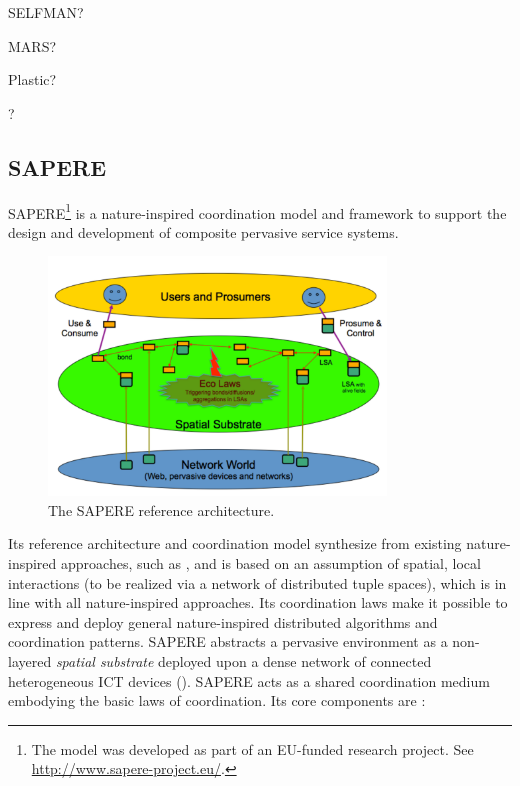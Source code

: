 \documentclass[12pt,a4paper,twoside,openright]{book}
\begin{document}
SELFMAN? \cite{selfman}

MARS? \cite{mars}

Plastic? \cite{plastic}

\cartago{}? \cite{RPV-JAAMAS2011}

\subsection{SAPERE}
SAPERE\footnote{The model was developed as part of an EU-funded research project. See \url{http://www.sapere-project.eu/}.} \cite{sapere-procedia7} is a nature-inspired coordination model and framework to support the design and development of composite pervasive service systems.
\begin{figure}
\centering
\includegraphics[width=0.8\textwidth]{img/architecture_2.pdf}
\caption[SAPERE reference architecture]{The SAPERE reference architecture.}
\label{img:sapere-architecture}
\end{figure}
%
Its reference architecture and coordination model synthesize from existing nature-inspired approaches, such as \cite{biochemicalTupleSpaces, frameworkSelfOrg, VCMZ-TAAS2011, wordNet}, and is based on an assumption of spatial, local interactions (to be realized via a network of distributed tuple spaces), which is in line with all nature-inspired approaches.
%
Its coordination laws make it possible to express and deploy general nature-inspired distributed algorithms and coordination patterns.
%
SAPERE abstracts a pervasive environment as a non-layered \emph{spatial substrate} deployed upon a dense network of connected heterogeneous ICT devices ().
%
SAPERE acts as a shared coordination medium embodying the basic laws of coordination.
%
Its core components are \cite{sapereecolaws-sac2012}:
\end{document}
